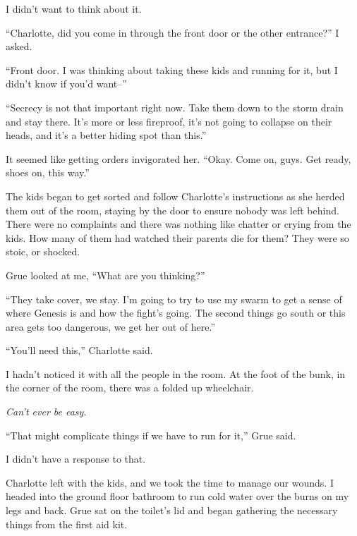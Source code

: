 I didn't want to think about it.



``Charlotte, did you come in through the front door or the other entrance?''  I asked.



``Front door.  I was thinking about taking these kids and running for it, but I didn't know if you'd want--''



``Secrecy is not that important right now.  Take them down to the storm drain and stay there.  It's more or less fireproof, it's not going to collapse on their heads, and it's a better hiding spot than this.''



It seemed like getting orders invigorated her.  ``Okay.  Come on, guys.  Get ready, shoes on, this way.''



The kids began to get sorted and follow Charlotte's instructions as she herded them out of the room, staying by the door to ensure nobody was left behind.  There were no complaints and there was nothing like chatter or crying from the kids.  How many of them had watched their parents die for them?  They were so stoic, or shocked.



Grue looked at me, ``What are you thinking?''



``They take cover, we stay.  I'm going to try to use my swarm to get a sense of where Genesis is and how the fight's going.  The second things go south or this area gets too dangerous, we get her out of here.''



``You'll need this,'' Charlotte said.



I hadn't noticed it with all the people in the room.  At the foot of the bunk, in the corner of the room, there was a folded up wheelchair.



\emph{Can't ever be easy}.



``That might complicate things if we have to run for it,'' Grue said.



I didn't have a response to that.



Charlotte left with the kids, and we took the time to manage our wounds.  I headed into the ground floor bathroom to run cold water over the burns on my legs and back.  Grue sat on the toilet's lid and began gathering the necessary things from the first aid kit.



